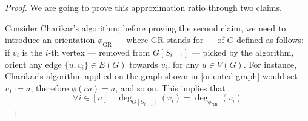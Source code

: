 \documentclass[a4paper, 12pt]{report}
\begin{document}
    \begin{proof}
        We are going to prove this approximation ratio through two claims.


        Consider Charikar's algorithm; before proving the second claim, we need to introduce an orientation $\phi_\mathrm{GR}$ --- where GR stands for  --- of $G$ defined as follows: if $v_i$ is the $i$-th vertex --- removed from $G[S_{i - 1}]$ --- picked by the algorithm, orient any edge $\{u, v_i\} \in E(G)$ towards $v_i$, for any $u \in V(G)$. For instance, Charikar's algorithm applied on the graph shown in \cref{oriented graph} would set $v_1 := a$, therefore $\phi(ca) = a$, and so on. This implies that $$\forall i \in [n] \quad \deg_{G[S_{i - 1}]}(v_i) = \deg_{\phi_\mathrm{GR}}(v_i)$$


\end{proof}
\end{document}
